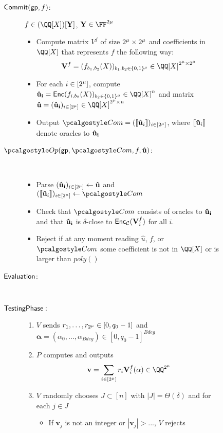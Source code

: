 \documentclass[11pt,letterpaper,usenames,dvipsnames]{article}
\begin{document}
\begin{figure}[H]
\begin{framed}
  \begin{description}
    \item[$\mathsf{Commit}(\mathsf{gp}, f)$:] $f\in\polyspace$, $\vec Y\in\FF^{2\mu}$ 
      \begin{itemize}
        \item Compute matrix $V^f$ of size $2^\mu\times2^\mu$ and coefficients in $\QQ[X]$ that represents $f$ the following way:
          $$\mathbf V^f=(f_{b_1, b_2}(X))_{b_1, b_2 \in \{0,1\}^\mu}\in \QQ[X]^{\size\times\size}$$
        \item For each $i\in[2^\mu]$, compute
          $\vectorUi=\encode(f_{i,b_2}(X))_{b_2\in\{0,1\}^\mu}\in\QQ[X]^n$ and matrix 
          $\matrixU=(\vectorUi)_{i\in [\size]}\in\QQ[X]^{\size\times n}$
        \item Output $\com=(\oracleUi)_{i\in[\size]}$, where $\llbracket\mathbf{\hat{u}}_i\rrbracket$ denote oracles to $\mathbf{\hat{u}_i}$
      \end{itemize}
    \item[$\open(\gp, \com, f, \matrixU)$:] \ \
      \begin{itemize}
        \item Parse $(\mathbf{\hat{u}_i})_{i\in[2^\mu]}\gets\mathbf{\hat{u}}$ and $(\oracleUi)_{i\in[\size]}\gets\com$
        \item Check that $\com$ consists of oracles to $\mathbf{\hat{u}_i}$ and that $\mathbf{\hat{u}_i}$ is $\delta$-close to $\mathsf{Enc}_{\mathcal{C}}(\mathbf{V}^f_i)$ for all $i$. 
        \item Reject if at any moment reading $\hat{u}$, $f$, or $\com$ some coefficient is not in $\QQ[X]$ or is larger than $poly()$
      \end{itemize}		
  \item[$\mathsf{Evaluation}$:] \
  \item[$\mathsf{Testing Phase}:$]
      \begin{enumerate}
					\item $V$ sends $r_1, \ldots, r_{2^\mu}\in[0, q_0-1]$ and $\mathbf \alpha=(\alpha_0, \ldots, \alpha_{Bdeg})\in[0, q_0-1]^{Bdeg}$
					\item $P$ computes and outputs 
					$$\mathbf{v}=\sum_{i\in[\size]}r_i\matrixV^f_i(\mathbf{\alpha})\in \QQ^{\size}$$
					\item $V$ randomly chooses $J\subset[n]$ with $|J|=\Theta(\delta)$ and for each $j\in J$
						\begin{itemize}
							\item If $\mathbf v_j$ is not an integer or $|\mathbf v_j|>...$, $V$ rejects

\end{itemize}
\end{enumerate}
\end{description}
\end{framed}
\end{figure}
\end{document}
